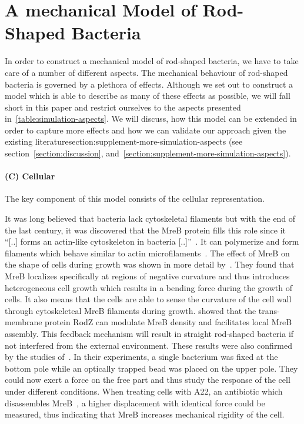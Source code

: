 \documentclass{article}
\begin{document}

\section{A mechanical Model of Rod-Shaped Bacteria}
\label{section:mechanical-model-rod-shaped-bacteria}

In order to construct a mechanical model of rod-shaped bacteria, we have to take care of a number of
different aspects.
The mechanical behaviour of rod-shaped bacteria is governed by a plethora of effects.
Although we set out to construct a model which is able to describe as many of these effects as
possible, we will fall short in this paper and restrict ourselves to the aspects presented
in~\ref{table:simulation-aspects}.
We will discuss, how this model can be extended in order to capture more effects and how we can
validate our approach given the existing literaturesection:supplement-more-simulation-aspects
(see section~\ref{section:discussion}, and~\ref{section:supplement-more-simulation-aspects}).

\paragraph{(C) Cellular}
The key component of this model consists of the cellular representation.

It was long believed that bacteria lack cytoskeletal filaments but with the end of the last century,
it was discovered that the MreB protein fills this role since it “[..] forms an actin-like
cytoskeleton in bacteria [..]”~\cite{Erickson2001}.
It can polymerize and form filaments which behave similar to actin microfilaments~\cite{Dersch2020}.
The effect of MreB on the shape of cells during growth was shown in more detail
by~\cite{Ursell2014}.
They found that MreB localizes specifically at regions of negative curvature and thus introduces
heterogeneous cell growth which results in a bending force during the growth of cells.
It also means that the cells are able to sense the curvature of the cell wall through cytoskeleteal
MreB filaments during growth.
\cite{Bratton2018} showed that the trans-membrane protein RodZ can modulate MreB density and
facilitates local MreB assembly.
This feedback mechanism will result in straight rod-shaped bacteria if not interfered from the
external environment.
These results were also confirmed by the studies of~\cite{Wang2010}.
In their experiments, a single bacterium was fixed at the bottom pole while an optically trapped
bead was placed on the upper pole.
They could now exert a force on the free part and thus study the response of the cell under
different conditions.
When treating cells with A22, an antibiotic which disassembles
MreB~\cite{IWAI2002,Gitai2005,Karczmarek2007,Bean2009}, a higher displacement with identical force
could be measured, thus indicating that MreB increases mechanical rigidity of the cell.
\end{document}
